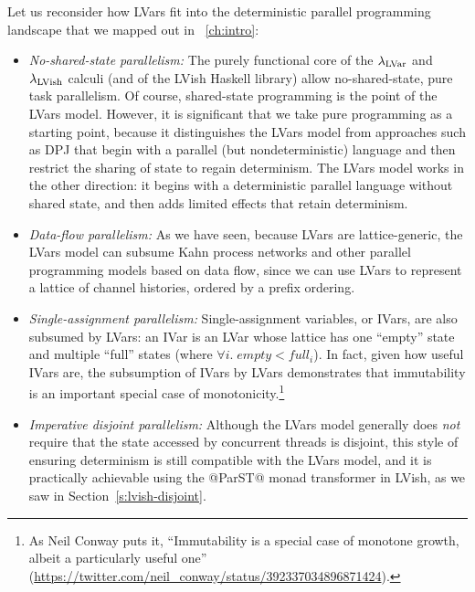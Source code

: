 Let us reconsider how LVars fit into the deterministic parallel
programming landscape that we mapped out in ~\ref{ch:intro}:
\begin{itemize}
  \item \emph{No-shared-state parallelism:} The purely functional core
    of the $\lambda_{\textrm{LVar}}$ and $\lambda_{\textrm{LVish}}$ calculi (and of the LVish
    Haskell library) allow no-shared-state, pure task parallelism.  Of
    course, shared-state programming is the point of the LVars model.
    However, it is significant that we take pure programming as a
    starting point, because it distinguishes the LVars model from
    approaches such as DPJ that begin with a
    parallel (but nondeterministic) language and then restrict the
    sharing of state to regain determinism.  The LVars model works in
    the other direction: it begins with a deterministic parallel
    language without shared state, and then adds limited effects that
    retain determinism.
  \item \emph{Data-flow parallelism:} As we have seen, because LVars
    are lattice-generic, the LVars model can subsume Kahn process
    networks and other parallel programming models based on data flow,
    since we can use LVars to represent a lattice of channel
    histories, ordered by a prefix ordering.
  \item \emph{Single-assignment parallelism:} Single-assignment
    variables, or IVars, are also subsumed by LVars: an IVar is an
    LVar whose lattice has one ``empty'' state and multiple ``full''
    states (where $\forall{i}.\; \mathit{empty} < \mathit{full_i}$).
    In fact, given how useful IVars are, the subsumption of IVars by
    LVars demonstrates that immutability is an important special case
    of monotonicity.\footnote{As Neil Conway puts it, ``Immutability
      is a special case of monotone growth, albeit a particularly
      useful one''
      (\url{https://twitter.com/neil_conway/status/392337034896871424}).}
  \item \emph{Imperative disjoint parallelism:} Although the LVars
    model generally does \emph{not} require that the state accessed by
    concurrent threads is disjoint, this style of ensuring determinism
    is still compatible with the LVars model, and it is practically
    achievable using the @ParST@ monad transformer in LVish, as we saw
    in Section~\ref{s:lvish-disjoint}.
\end{itemize}

